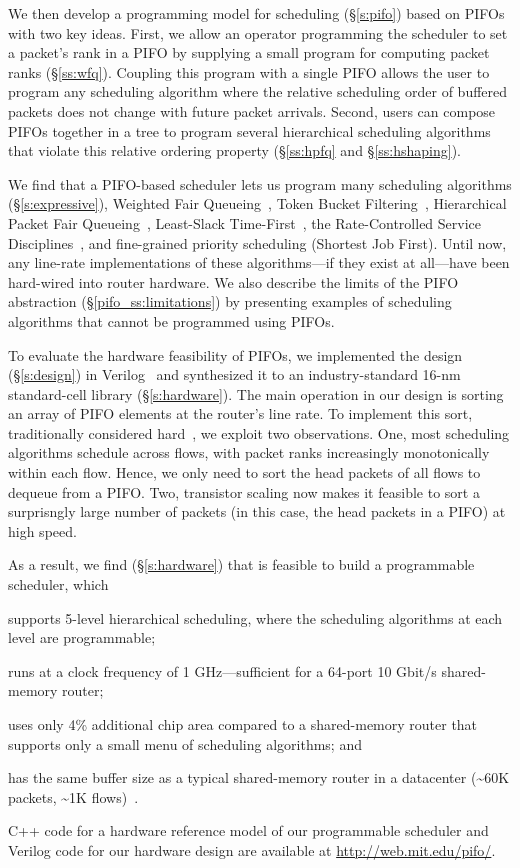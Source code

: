 We then develop a programming model for scheduling (\S\ref{s:pifo}) based on
PIFOs with two key ideas. First, we allow an operator programming the scheduler
to set a packet's rank in a PIFO by supplying a small program for computing
packet ranks (\S\ref{ss:wfq}).  Coupling this program with a single PIFO allows
the user to program any scheduling algorithm where the relative scheduling
order of buffered packets does not change with future packet arrivals. Second,
users can compose PIFOs together in a tree to program several hierarchical
scheduling algorithms that violate this relative ordering property
(\S\ref{ss:hpfq} and \S\ref{ss:hshaping}).

We find that a PIFO-based scheduler lets us program many scheduling algorithms
(\S\ref{s:expressive}), \eg Weighted Fair Queueing~\cite{wfq}, Token Bucket
Filtering~\cite{tbf}, Hierarchical Packet Fair Queueing~\cite{hpfq},
Least-Slack Time-First~\cite{lstf}, the Rate-Controlled Service
Disciplines~\cite{rcsd}, and fine-grained priority scheduling (\eg Shortest Job
First). Until now, any line-rate implementations of these algorithms---if they
exist at all---have been hard-wired into router hardware. We also describe the
limits of the PIFO abstraction (\S\ref{pifo_ss:limitations}) by presenting
examples of scheduling algorithms that cannot be programmed using PIFOs.

To evaluate the hardware feasibility of PIFOs, we implemented the design
(\S\ref{s:design}) in Verilog~\cite{system_verilog} and synthesized it to an
industry-standard 16-nm standard-cell library (\S\ref{s:hardware}). The main
operation in our design is sorting an array of PIFO elements at the router's
line rate. To implement this sort, traditionally considered hard~\cite{sfq,
drr}, we exploit two observations. One, most scheduling algorithms schedule
across flows, with packet ranks increasingly monotonically within each flow.
Hence, we only need to sort the head packets of all flows to dequeue from a
PIFO.  Two, transistor scaling now makes it feasible to sort a surprisngly
large number of packets (in this case, the head packets in a PIFO) at high
speed.

As a result, we find (\S\ref{s:hardware}) that is feasible to build a
programmable scheduler, which
\begin{CompactItemize}
  \item supports 5-level hierarchical scheduling, where the scheduling
    algorithms at each level are programmable;
  \item runs at a clock frequency of 1 GHz---sufficient for a 64-port
    10 Gbit/s shared-memory router;
  \item uses only 4\% additional chip area compared to a
    shared-memory router that supports only a small menu of scheduling
    algorithms; and
  \item has the same buffer size as a typical shared-memory router
    in a datacenter (\textasciitilde 60K packets, \textasciitilde 1K flows)~\cite{trident2}.
\end{CompactItemize}

 C++ code for a hardware reference model of our programmable scheduler and
Verilog code for our hardware design are available at
\url{http://web.mit.edu/pifo/}.
